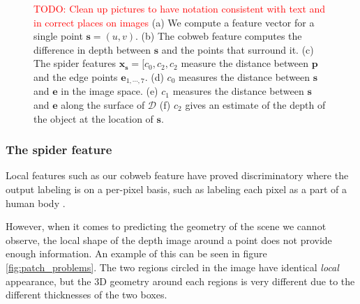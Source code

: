 \documentclass[10pt,twocolumn,letterpaper]{article}
\newcommand{\rgbdimage}{\mathcal{D}}
\newcommand{\pixelidx}{\mathbf{s}}
\newcommand{\edgeimidx}{\mathbf{e}}
\newcommand{\point}{\mathbf{p}}
\newcommand{\todo}[1]{\textcolor{red}{TODO: #1}}
\newcommand{\note}[1]{\textcolor{blue}{NOTE: #1}}
\begin{document}
\begin{figure}[tb]
        \hfill
        \hfill
    \caption{
    \todo{Clean up pictures to have notation consistent with text and in correct places on images}
    (a) We compute a feature vector for a single point $\pixelidx = (u, v)$.
    (b) The cobweb feature computes the difference in depth between $\pixelidx$ and the points that surround it.
    (c) The spider features $\mathbf{x_s} = [c_0, c_2, c_2$ measure the distance between $\point$ and the edge points $\edgeimidx_{1, \cdots, 7}$.
    (d) $c_0$ measures the distance between $\pixelidx$ and $\edgeimidx$ in the image space.
    (e) $c_1$ measures the distance between $\pixelidx$ and $\edgeimidx$ along the surface of $\rgbdimage$
    (f) $c_2$ gives an estimate of the depth of the object at the location of $\pixelidx$.
    }%
    \label{fig:features}
\end{figure}


\subsubsection{The spider feature}

Local features such as our cobweb feature have proved discriminatory where the output labeling is on a per-pixel basis, such as labeling each pixel as a part of a human body \cite{shotton-cvpr-2011}.

However, when it comes to predicting the geometry of the scene we cannot observe, the local shape of the depth image around a point does not provide enough information. 
An example of this can be seen in figure \ref{fig:patch_problems}.
The two regions circled in the image have identical \emph{local} appearance, but the 3D geometry around each regions is very different due to the different thicknesses of the two boxes.
\end{document}
